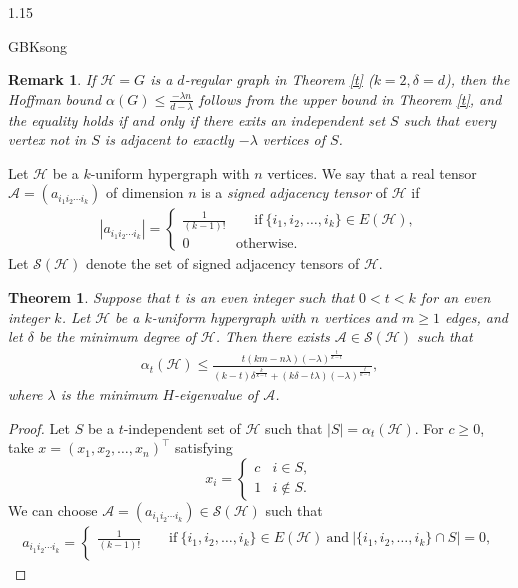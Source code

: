 \documentclass[preprint,12pt]{elsarticle}
\newtheorem{thm}{Theorem}[section]
\newtheorem{rem}{Remark}
\begin{document}
\begin{spacing}{1.15}
\begin{CJK*}{GBK}{song}
\begin{rem}\label{d}
If $\mathcal{H}=G$ is a $d$-regular graph in Theorem \ref{t} ($k=2,\delta=d$), then the Hoffman bound $\alpha(G) \leqslant\frac{-\lambda n}{{d - {\lambda }}}$ follows from the upper bound in Theorem \ref{t}, and the equality holds if and only if there exits an independent set $S$ such that every vertex not in $S$ is adjacent to exactly $-\lambda$ vertices of $S$.
\end{rem}
Let $\mathcal{H}$ be a $k$-uniform hypergraph with $n$ vertices. We say that a real tensor $\mathcal{A}=(a_{i_1i_2\cdots i_k})$ of dimension $n$ is a \textit{signed adjacency tensor} of $\mathcal{H}$ if
\begin{eqnarray*}
|a_{i_1i_2\cdots i_k}|=\begin{cases}\frac{1}{(k-1)!}~~~~~~~~~\mbox{if}~\{i_1,i_2,\ldots,i_k\}\in E(\mathcal{H}),\\
0~~~~~~~~~~~~~~~\mbox{otherwise}.\end{cases}
\end{eqnarray*}
Let $\mathcal{S}(\mathcal{H})$ denote the set of signed adjacency tensors of $\mathcal{H}$.
\begin{thm}
Suppose that $t$ is an even integer such that $0<t<k$ for an even integer $k$. Let $\mathcal{H}$ be a $k$-uniform hypergraph with $n$ vertices and $m\geq1$ edges, and let $\delta$ be the minimum degree of $\mathcal{H}$. Then there exists $\mathcal{A}\in\mathcal{S}(\mathcal{H})$ such that
\begin{eqnarray*}
{\alpha _t}(\mathcal{H}) \leqslant \frac{{t\left( {km - n \lambda } \right){{\left( { - \lambda } \right)}^{\frac{t}{{k - t}}}}}}{{\left( {k - t} \right){\delta ^{\frac{k}{{k - t}}}} + \left( {k \delta  - t\lambda } \right){{\left( { - \lambda } \right)}^{\frac{t}{{k - t}}}}}},
\end{eqnarray*}
where $\lambda$ is the minimum $H$-eigenvalue of $\mathcal{A}$.
\end{thm}
\begin{proof}
Let $S$ be a $t$-independent set of $\mathcal{H}$ such that $|S|=\alpha_t(\mathcal{H})$. For $c\geq0$, take $x=(x_1,x_2,\ldots,x_n)^\top$ satisfying
$${x_i} =
\begin{cases}
c & i \in S,\\
1 & i \notin S.
\end{cases}
$$
We can choose $\mathcal{A}=(a_{i_1i_2\cdots i_k})\in\mathcal{S}(\mathcal{H})$ such that
\begin{eqnarray*}
a_{i_1i_2\cdots i_k}=\begin{cases}\frac{1}{(k-1)!}~~~~~~~~~\mbox{if}~\{i_1,i_2,\ldots,i_k\}\in E(\mathcal{H})~\mbox{and}~|\{i_1,i_2,\ldots,i_k\}\cap S|=0,\\

\end{cases}
\end{eqnarray*}
\end{proof}
\end{CJK*}
\end{spacing}
\end{document}

